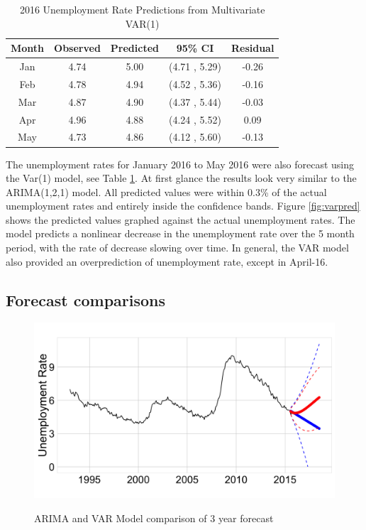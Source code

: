 \documentclass[twoside,twocolumn]{article}
\begin{document}
\begin{table}[ht]
\centering
\small
\caption{2016 Unemployment Rate Predictions from Multivariate VAR(1)}
\label{tab:varforecast}
\begin{tabular}{ccccc}
  \hline
Month & Observed & Predicted& 95\% CI  & Residual \\
  \hline
Jan  & 4.74 & 5.00 & (4.71 , 5.29) & -0.26 \\
Feb & 4.78 & 4.94 & (4.52 , 5.36) & -0.16 \\
Mar  & 4.87 & 4.90 & (4.37 , 5.44) & -0.03 \\
Apr & 4.96 & 4.88 & (4.24 , 5.52) & 0.09 \\
May & 4.73 & 4.86 & (4.12 , 5.60) & -0.13 \\
   \hline
\end{tabular}
\end{table}

The unemployment rates for January 2016 to May 2016 were also forecast using the Var(1) model, see Table \ref{tab:varforecast}.  At first glance the results look very similar to the ARIMA(1,2,1) model. All predicted values were within 0.3\% of the actual unemployment rates and entirely inside the confidence bands.  Figure \ref{fig:varpred} shows the predicted values graphed against the actual unemployment rates. The model predicts a nonlinear decrease in the unemployment rate over the 5 month period, with the rate of decrease slowing over time.  In general, the VAR model also provided an overprediction of unemployment rate, except in April-16.

 \subsection{Forecast comparisons}
    \begin{figure}[htb]
    	\centering
     	\caption{ARIMA and VAR Model comparison of 3 year  forecast}
     	\includegraphics[width=\linewidth]{images/arimavarforecast}
     	\label{fig:arimavarforecast}
 \end{figure}
\end{document}
